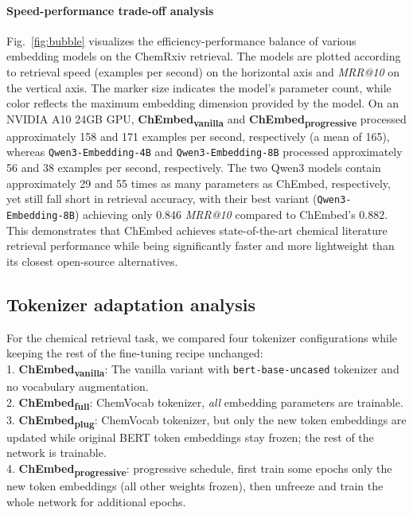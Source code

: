\documentclass[twoside,twocolumn,9pt]{article}
\begin{document}
\paragraph*{Speed-performance trade-off analysis}
Fig.~\ref{fig:bubble} visualizes the efficiency-performance balance of various embedding models on the ChemRxiv retrieval. The models are plotted according to retrieval speed (examples per second) on the horizontal axis and \textit{MRR@10} on the vertical axis. The marker size indicates the model's parameter count, while color reflects the maximum embedding dimension provided by the model. On an NVIDIA A10 24GB GPU, \textbf{ChEmbed\textsubscript{vanilla}} and \textbf{ChEmbed\textsubscript{progressive}} processed approximately 158 and 171 examples per second, respectively (a mean of 165), whereas \texttt{Qwen3-Embedding-4B} and \texttt{Qwen3-Embedding-8B} processed approximately 56 and 38 examples per second, respectively. The two Qwen3 models contain approximately 29 and 55 times as many parameters as ChEmbed, respectively, yet still fall short in retrieval accuracy, with their best variant (\texttt{Qwen3-Embedding-8B}) achieving only 0.846 \textit{MRR@10} compared to ChEmbed's 0.882. This demonstrates that ChEmbed achieves state-of-the-art chemical literature retrieval performance while being significantly faster and more lightweight than its closest open-source alternatives.

\subsection{Tokenizer adaptation analysis}
\label{subsec:tokenizer}

For the chemical retrieval task, we compared four tokenizer configurations while keeping the rest of the fine-tuning recipe unchanged: \\
     1.\textbf{ ChEmbed\textsubscript{vanilla}}: The vanilla variant with \texttt{bert-base-uncased} tokenizer and no vocabulary augmentation.  \\
     2.\textbf{ ChEmbed\textsubscript{full}}: ChemVocab tokenizer, \emph{all} embedding parameters are trainable.  \\
     3.\textbf{ ChEmbed\textsubscript{plug}}: ChemVocab tokenizer, but only the new token embeddings are updated while original BERT token embeddings stay frozen; the rest of the network is trainable. \\
    4.\textbf{  ChEmbed\textsubscript{progressive}}: progressive schedule, first train some epochs only the new token embeddings (all other weights frozen), then unfreeze and train the whole network for additional epochs.
\end{document}
